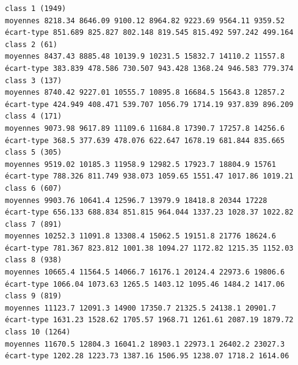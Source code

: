 \documentclass[land,article,submit,pdftex,moreauthors]{Definitions/mdpi}
\begin{document}
\begin{scriptsize}
\begin{verbatim}
class 1 (1949)
moyennes 8218.34 8646.09 9100.12 8964.82 9223.69 9564.11 9359.52
écart-type 851.689 825.827 802.148 819.545 815.492 597.242 499.164
class 2 (61)
moyennes 8437.43 8885.48 10139.9 10231.5 15832.7 14110.2 11557.8
écart-type 383.839 478.586 730.507 943.428 1368.24 946.583 779.374
class 3 (137)
moyennes 8740.42 9227.01 10555.7 10895.8 16684.5 15643.8 12857.2
écart-type 424.949 408.471 539.707 1056.79 1714.19 937.839 896.209
class 4 (171)
moyennes 9073.98 9617.89 11109.6 11684.8 17390.7 17257.8 14256.6
écart-type 368.5 377.639 478.076 622.647 1678.19 681.844 835.665
class 5 (305)
moyennes 9519.02 10185.3 11958.9 12982.5 17923.7 18804.9 15761
écart-type 788.326 811.749 938.073 1059.65 1551.47 1017.86 1019.21
class 6 (607)
moyennes 9903.76 10641.4 12596.7 13979.9 18418.8 20344 17228
écart-type 656.133 688.834 851.815 964.044 1337.23 1028.37 1022.82
class 7 (891)
moyennes 10252.3 11091.8 13308.4 15062.5 19151.8 21776 18624.6
écart-type 781.367 823.812 1001.38 1094.27 1172.82 1215.35 1152.03
class 8 (938)
moyennes 10665.4 11564.5 14066.7 16176.1 20124.4 22973.6 19806.6
écart-type 1066.04 1073.63 1265.5 1403.12 1095.46 1484.2 1417.06
class 9 (819)
moyennes 11123.7 12091.3 14900 17350.7 21325.5 24138.1 20901.7
écart-type 1631.23 1528.62 1705.57 1968.71 1261.61 2087.19 1879.72
class 10 (1264)
moyennes 11670.5 12804.3 16041.2 18903.1 22973.1 26402.2 23027.3
écart-type 1202.28 1223.73 1387.16 1506.95 1238.07 1718.2 1614.06


\end{verbatim}
\end{scriptsize}
\end{document}
